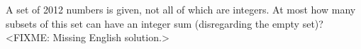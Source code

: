 \problem
A set of 2012 numbers is given, not all of which are integers.
At most how many subsets of this set can have an integer sum
(disregarding the empty set)?
\solution
<FIXME: Missing English solution.>
\endproblem
